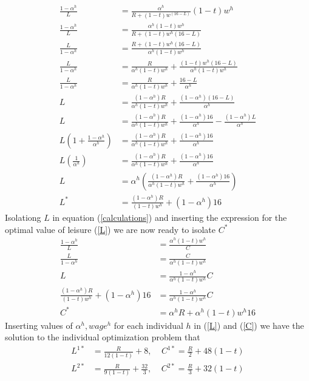 \begin{align}
  \frac{1-\alpha^h}{L}&= \frac{\alpha^h}{R+(1-t)w^(16-L)}(1-t)w^h \nonumber \\
  \frac{1-\alpha^h}{L}&= \frac{\alpha^h(1-t)w^h}{R+(1-t)w^h(16-L)} \nonumber \\
  \frac{L}{1-\alpha^h}&= \frac{R+(1-t)w^h(16-L)}{\alpha^h(1-t)w^h} \nonumber \\
  \frac{L}{1-\alpha^h}&= \frac{R}{\alpha^h(1-t)w^h}+\frac{(1-t)w^h(16-L)}{\alpha^h(1-t)w^h} \nonumber \\
  \frac{L}{1-\alpha^h}&= \frac{R}{\alpha^h(1-t)w^h}+\frac{16-L}{\alpha^h} \nonumber \\
  L&= \frac{(1-\alpha^h)R}{\alpha^h(1-t)w^h}+\frac{(1-\alpha^h)(16-L)}{\alpha^h} \nonumber \\
  L&= \frac{(1-\alpha^h)R}{\alpha^h(1-t)w^h}+\frac{(1-\alpha^h)16}{\alpha^h}-\frac{(1-\alpha^h)L}{\alpha^h} \nonumber \\
  L\left(1+\frac{1-\alpha^h}{\alpha^h}\right)&= \frac{(1-\alpha^h)R}{\alpha^h(1-t)w^h}+\frac{(1-\alpha^h)16}{\alpha^h} \nonumber \\
  L\left(\frac{1}{\alpha^h}\right)&= \frac{(1-\alpha^h)R}{\alpha^h(1-t)w^h}+\frac{(1-\alpha^h)16}{\alpha^h} \nonumber \\
  L&= \alpha^h\left(\frac{(1-\alpha^h)R}{\alpha^h(1-t)w^h}+\frac{(1-\alpha^h)16}{\alpha^h}\right) \nonumber \\
  L^{*}&= \frac{(1-\alpha^h)R}{(1-t)w^h}+(1-\alpha^h)16 \label{L}
\end{align}
Isolationg $L$ in equation (\ref{calculations}) and inserting the expression for the optimal value of leisure (\ref{L}) we are now ready to isolate $C^{*}$
\begin{align}
  \frac{1-\alpha^h}{L}&= \frac{\alpha^h(1-t)w^h}{C} \nonumber\\
  \frac{L}{1-\alpha^h}&= \frac{C}{\alpha^h(1-t)w^h} \nonumber\\
  L&= \frac{1-\alpha^h}{\alpha^h(1-t)w^h}C \nonumber\\
  \frac{(1-\alpha^h)R}{(1-t)w^h}+(1-\alpha^h)16 &= \frac{1-\alpha^h}{\alpha^h(1-t)w^h}C \nonumber\\
  C^{*}&=\alpha^hR+\alpha^h(1-t)w^h16 \label{C}
\end{align}
Inserting values of $\alpha^h,wage^h$ for each individual $h$ in (\ref{L}) and (\ref{C}) we have the solution to the individual optimization problem that
\begin{equation}
  \begin{split}
    L^{1*}&=\frac{R}{12(1-t)}+8,\ \ \ \ \ C^{1*}=\frac{R}{2}+48(1-t) \\
    L^{2*}&=\frac{R}{9(1-t)}+\frac{32}{3},\ \ \ \ \ C^{2*}=\frac{R}{3}+32(1-t)\label{ind_optimization}
  \end{split}
\end{equation}
